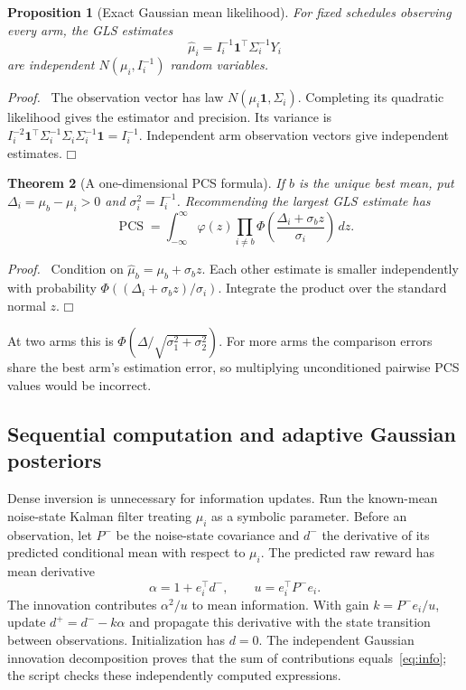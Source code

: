\documentclass[11pt]{article}
\newtheorem{theorem}{Theorem}
\newtheorem{proposition}[theorem]{Proposition}
\newenvironment{proof}{\par\noindent\textit{Proof.}\ }{\hfill$\mdlgwhtsquare$\par\medskip}
\newcommand{\PCS}{\operatorname{PCS}}
\begin{document}
\begin{proposition}[Exact Gaussian mean likelihood]
For fixed schedules observing every arm, the GLS estimates
\begin{equation}
\widehat\mu_i=I_i^{-1}\mathbf1^\top\Sigma_i^{-1}Y_i
\end{equation}
are independent $N(\mu_i,I_i^{-1})$ random variables.
\end{proposition}
\begin{proof}
The observation vector has law $N(\mu_i\mathbf1,\Sigma_i)$. Completing its quadratic likelihood gives the estimator and precision. Its variance is $I_i^{-2}\mathbf1^\top\Sigma_i^{-1}\Sigma_i\Sigma_i^{-1}\mathbf1=I_i^{-1}$. Independent arm observation vectors give independent estimates.
\end{proof}

\begin{theorem}[A one-dimensional PCS formula]
If $b$ is the unique best mean, put $\Delta_i=\mu_b-\mu_i>0$ and $\sigma_i^2=I_i^{-1}$. Recommending the largest GLS estimate has
\begin{equation}
\boxed{\PCS=
\int_{-\infty}^{\infty}\varphi(z)
\prod_{i\ne b}\Phi\left(\frac{\Delta_i+\sigma_bz}{\sigma_i}\right)\,dz.}
\label{eq:pcs}
\end{equation}
\end{theorem}
\begin{proof}
Condition on $\widehat\mu_b=\mu_b+\sigma_bz$. Each other estimate is smaller independently with probability $\Phi((\Delta_i+\sigma_bz)/\sigma_i)$. Integrate the product over the standard normal $z$.
\end{proof}
At two arms this is $\Phi(\Delta/\sqrt{\sigma_1^2+\sigma_2^2})$. For more arms the comparison errors share the best arm's estimation error, so multiplying unconditioned pairwise PCS values would be incorrect.

\subsection{Sequential computation and adaptive Gaussian posteriors}
Dense inversion is unnecessary for information updates. Run the known-mean noise-state Kalman filter treating $\mu_i$ as a symbolic parameter. Before an observation, let $P^-$ be the noise-state covariance and $d^-$ the derivative of its predicted conditional mean with respect to $\mu_i$. The predicted raw reward has mean derivative
\[
\alpha=1+e_i^\top d^-,\qquad u=e_i^\top P^-e_i.
\]
The innovation contributes $\alpha^2/u$ to mean information. With gain $k=P^-e_i/u$, update $d^+=d^--k\alpha$ and propagate this derivative with the state transition between observations. Initialization has $d=0$. The independent Gaussian innovation decomposition proves that the sum of contributions equals~\eqref{eq:info}; the script checks these independently computed expressions.
\end{document}
